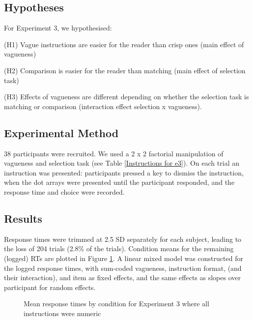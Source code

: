 \documentclass[%
man,		%
floatsintext,%
apacite%
]{apa6}
\begin{document}
\subsection{Hypotheses} %
\noindent For Experiment 3, we hypothesised:
{\small
\begin{APAenumerate}
	\item [(H1)] Vague instructions are easier for the reader than crisp ones (main effect of vagueness)
	\item [(H2)] Comparison is easier for the reader than matching (main effect of selection task)
	\item [(H3)] Effects of vagueness are different depending on whether the selection task is matching or comparison (interaction effect selection x vagueness).
\end{APAenumerate}
}

\subsection{Experimental Method} %

38 participants were recruited. We used a 2 x 2 factorial manipulation of vagueness and selection task (see Table \ref{Instructions for e3}).
On each trial an instruction was presented: participants pressed a key to dismiss the instruction, when the dot arrays were presented until the participant responded, and the response time and choice were recorded.

\subsection{Results} %

Response times were trimmed at 2.5 SD separately for each subject, leading to the loss of 204 trials (2.8\% of the trials).
Condition means for the remaining (logged) RTs are plotted in Figure \ref{resultse3}.
A linear mixed model was constructed for the logged response times, 
with sum-coded vagueness, instruction format, (and their interaction), and item as fixed effects, and the same effects as slopes over participant for random effects.

\begin{figure}[htbp]
\centering
{}
\caption{Mean response times by condition for Experiment 3 where all instructions were numeric}
\label{resultse3}
\end{figure}
\end{document}
